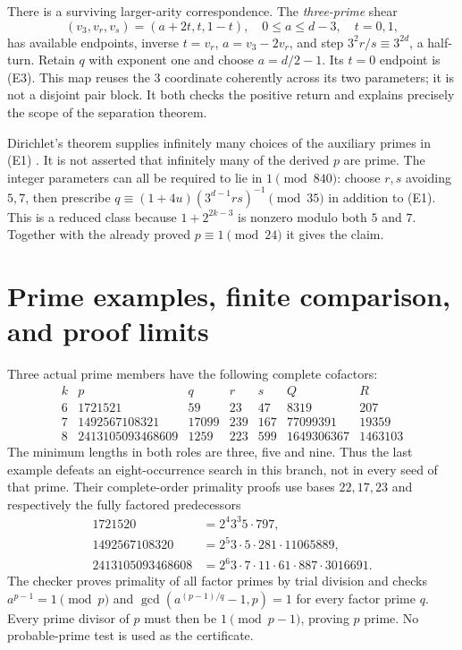 There is a surviving larger-arity correspondence. The \emph{three-prime} shear
\[
 (v_3,v_r,v_s)=(a+2t,t,1-t),\quad0\le a\le d-3,\quad t=0,1, \tag{E6}
\]
has available endpoints, inverse $t=v_r$, $a=v_3-2v_r$, and step
$3^2r/s\equiv3^{2d}$, a half-turn. Retain $q$ with exponent one and choose
$a=d/2-1$. Its $t=0$ endpoint is (E3). This map reuses the $3$ coordinate
coherently across its two parameters; it is not a disjoint pair block.
It both checks the positive return and explains precisely the scope of the
separation theorem.

Dirichlet's theorem supplies infinitely many choices of the auxiliary primes
in (E1) \cite[Theorem 18.1]{Dirichlet}. It is not asserted that infinitely many
of the derived $p$ are prime. The integer parameters can all be required to
lie in $1\pmod{840}$: choose $r,s$ avoiding $5,7$, then prescribe
$q\equiv(1+4u)(3^{d-1}rs)^{-1}\pmod{35}$ in addition to (E1).
This is a reduced class because $1+2^{2k-3}$ is nonzero modulo both $5$ and $7$.
Together with the already proved $p\equiv1\pmod{24}$ it gives the claim.

\section{Prime examples, finite comparison, and proof limits}
Three actual prime members have the following complete cofactors:
\[
\begin{array}{c|r|rrr|r|r}
 k&p&q&r&s&Q&R\\\hline
 6&1721521&59&23&47&8319&207\\
 7&1492567108321&17099&239&167&77099391&19359\\
 8&2413105093468609&1259&223&599&1649306367&1463103
\end{array}
\]
The minimum lengths in both roles are three, five and nine. Thus the last
example defeats an eight-occurrence search in this branch, not in every seed
of that prime. Their complete-order primality proofs use bases $22,17,23$ and
respectively the fully factored predecessors
\[
\begin{aligned}
1721520&=2^4 3^3 5\cdot797,\\
1492567108320&=2^5 3\cdot5\cdot281\cdot11065889,\\
2413105093468608&=2^6 3\cdot7\cdot11\cdot61\cdot887\cdot3016691.
\end{aligned}
\]
The checker proves primality of all factor primes by trial division and checks
$a^{p-1}=1\pmod p$ and $\gcd(a^{(p-1)/q}-1,p)=1$ for every factor prime $q$.
Every prime divisor of $p$ must then be $1\pmod{p-1}$, proving $p$ prime.
No probable-prime test is used as the certificate.

